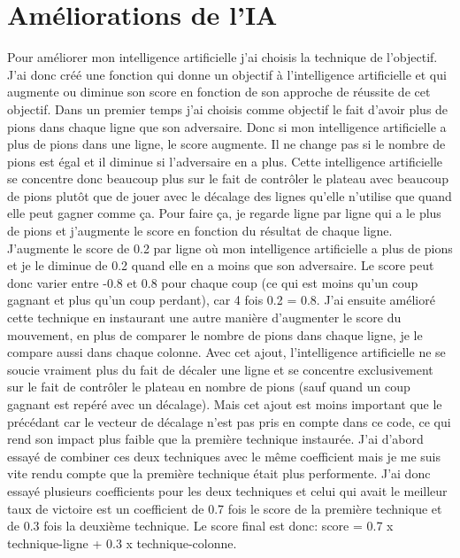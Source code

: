 \documentclass{report}
\begin{document}
\chapter{Améliorations de l'IA}
Pour améliorer mon intelligence artificielle j'ai choisis la technique de l'objectif. J'ai donc créé une fonction qui donne un objectif à l'intelligence artificielle et qui augmente ou diminue son score en fonction de son approche de réussite de cet objectif.
\newline Dans un premier temps j'ai choisis comme objectif le fait d'avoir plus de pions dans chaque ligne que son adversaire. Donc si mon intelligence artificielle a plus de pions dans une ligne, le score augmente. Il ne change pas si le nombre de pions est égal et il diminue si l'adversaire en a plus. Cette intelligence artificielle se concentre donc beaucoup plus sur le fait de contrôler le plateau avec beaucoup de pions plutôt que de jouer avec le décalage des lignes qu'elle n'utilise que quand elle peut gagner comme ça. Pour faire ça, je regarde ligne par ligne qui a le plus de pions et j'augmente le score en fonction du résultat de chaque ligne. J'augmente le score de 0.2 par ligne où mon intelligence artificielle a plus de pions et je le diminue de 0.2 quand elle en a moins que son adversaire. Le score peut donc varier entre -0.8 et 0.8 pour chaque coup (ce qui est moins qu'un coup gagnant et plus qu'un coup perdant), car 4 fois 0.2 = 0.8.
\newline J'ai ensuite amélioré cette technique en instaurant une autre manière d'augmenter le score du mouvement, en plus de comparer le nombre de pions dans chaque ligne, je le compare aussi dans chaque colonne. Avec cet ajout, l'intelligence artificielle ne se soucie vraiment plus du fait de décaler une ligne et se concentre exclusivement sur le fait de contrôler le plateau en nombre de pions (sauf quand un coup gagnant est repéré avec un décalage). Mais cet ajout est moins important que le précédant car le vecteur de décalage n'est pas pris en compte dans ce code, ce qui rend son impact plus faible que la première technique instaurée. 
\newline J'ai d'abord essayé de combiner ces deux techniques avec le même coefficient mais je me suis vite rendu compte que la première technique était plus performente. J'ai donc essayé plusieurs coefficients pour les deux techniques et celui qui avait le meilleur taux de victoire est un coefficient de 0.7 fois le score de la première technique et de 0.3 fois la deuxième technique.
\newline Le score final est donc: score = 0.7 x technique-ligne + 0.3 x technique-colonne.
\end{document}
